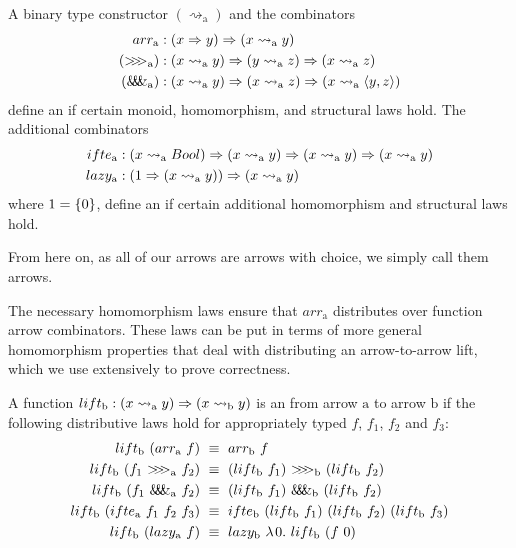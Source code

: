 \documentclass[preprint]{sigplanconf}
\newcommand{\arrow}{\rightsquigarrow}
\newcommand{\arrowlift}{\ensuremath{lift}}
\newcommand{\arrowarr}{\ensuremath{arr}}
\newcommand{\arrowcomp}{\ensuremath{{>}\mspace{-6mu}{>}\mspace{-6mu}{>}}}
\newcommand{\arrowpair}{\ensuremath{\mathit{\&\mspace{-7.5mu}\&\mspace{-7.5mu}\&}}}
\newcommand{\arrowif}{\ensuremath{ifte}}
\newcommand{\arrowlazy}{\ensuremath{lazy}}
\newcommand{\gen}{_\mathrm{a}}
\newcommand{\genb}{_\mathrm{b}}
\begin{document}
\begin{definition}A binary type constructor $(\arrow\gen)$ and the combinators
\begin{equation}
\begin{aligned}
	\arrowarr\gen &: (x \tto y) \tto (x \arrow\gen y)
\\
	(\arrowcomp\gen) &: (x \arrow\gen y) \tto (y \arrow\gen z) \tto (x \arrow\gen z)
\\
	(\arrowpair\gen) &: (x \arrow\gen y) \tto (x \arrow\gen z) \tto (x \arrow\gen \pair{y,z})
\end{aligned}
\label{eqn:arrow-combinators}
\end{equation}
define an  if certain monoid, homomorphism, and structural laws hold.
The additional combinators
\begin{equation}
\begin{aligned}
	\arrowif\gen &: (x \arrow\gen Bool) \tto (x \arrow\gen y) \tto (x \arrow\gen y) \tto (x \arrow\gen y)
\\
	\arrowlazy\gen &: (1 \tto (x \arrow\gen y)) \tto (x \arrow\gen y)
\end{aligned}
\end{equation}
where $1 = \{{0}\}$, define an  if certain additional homomorphism and structural laws hold.
\end{definition}

From here on, as all of our arrows are arrows with choice, we simply call them arrows.

The necessary homomorphism laws ensure that $\arrowarr\gen$ distributes over function arrow combinators.
These laws can be put in terms of more general homomorphism properties that deal with distributing an arrow-to-arrow lift, which we use extensively to prove correctness.

\begin{definition}
A function $lift\genb : (x \arrow\gen y) \tto (x \arrow\genb y)$ is an  from arrow $\mathrm{a}$ to arrow $\mathrm{b}$ if the following distributive laws hold for appropriately typed $f$, $f_1$, $f_2$ and $f_3$:
\begin{align}
	lift\genb~(\arrowarr\gen~f) &\ \equiv \ \arrowarr\genb~f
	\label{eqn:lift-distributes-over-arr}
\\
	lift\genb~(f_1~\arrowcomp\gen~f_2) &\ \equiv \ (lift\genb~f_1)~\arrowcomp\genb~(lift\genb~f_2)
	\label{eqn:lift-distributes-over-comp}
\\
	lift\genb~(f_1~\arrowpair\gen~f_2) &\ \equiv \ (lift\genb~f_1)~\arrowpair\genb~(lift\genb~f_2)
	\label{eqn:lift-distributes-over-pair}
\\
	\arrowlift\genb~(\arrowif\gen~f_1~f_2~f_3) &\ \equiv \ 
		\arrowif\genb~(lift\genb~f_1)~(lift\genb~f_2)~(lift\genb~f_3)
	\label{eqn:lift-distributes-over-if}
\\
	\arrowlift\genb~(\arrowlazy\gen~f) &\ \equiv \
		\arrowlazy\genb~\fun{0}{\arrowlift\genb~(f~0)}
	\label{eqn:lift-distributes-over-lazy}
\end{align}
\label{def:arrow-homomorphism}
\end{definition}
\end{document}

